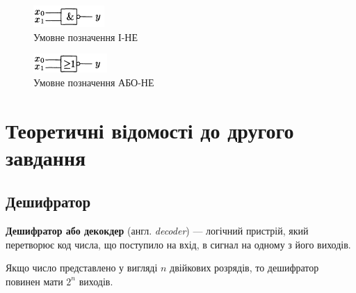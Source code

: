 \begin{figure}[h!]
 	\includegraphics[scale=1]{nand_sign.png}
 	\centering
	\caption{Умовне позначення І-НЕ}\label{fig:nand}
\end{figure}
\begin{figure}[h!]
 	\includegraphics[scale=1]{nor_sign.png}
 	\centering
	\caption{Умовне позначення АБО-НЕ}\label{fig:nor}
\end{figure}	

\newpage
\section{Теоретичні відомості до другого завдання}
\subsection{Дешифратор}
\textbf{Дешифратор або декокдер} (англ. \emph{decoder}) — логічний пристрій, який перетворює код числа, що поступило на вхід, в сигнал на одному з його виходів.

Якщо число представлено у вигляді $n$ двійкових розрядів, то дешифратор повинен мати $2^{n}$ виходів.

